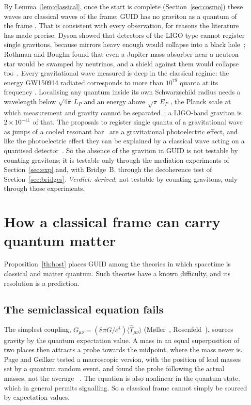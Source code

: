 By Lemma~\ref{lem:classical}, once the start is complete (Section~\ref{sec:cosmo}) these waves are classical waves of the frame: GUID has no graviton as a quantum
of the frame \tagD. That is consistent with every observation, for reasons the literature has made precise. Dyson showed that detectors of
the LIGO type cannot register single gravitons, because mirrors heavy enough would collapse into a black hole~\cite{dyson}; Rothman and
Boughn found that even a Jupiter-mass absorber near a neutron star would be swamped by neutrinos, and a shield against them would collapse
too~\cite{rb}. Every gravitational wave measured is deep in the classical regime: the energy GW150914 radiated corresponds to more than $10^{78}$
quanta at its frequency . Localising any quantum inside its own Schwarzschild radius needs a wavelength below $\sqrt{4\pi}\,L_P$ and
an energy above $\sqrt\pi\,E_P$ , the Planck scale at which measurement and gravity cannot be separated~\cite{mead}; a LIGO-band
graviton is $2\times10^{-41}$ of that. The proposals to register single quanta of a gravitational wave as jumps of a cooled resonant
bar~\cite{tobar} are a gravitational photoelectric effect, and like the photoelectric effect they can be explained by a classical wave acting
on a quantised detector~\cite{cdr}. So the absence of the graviton in GUID is not testable by counting gravitons; it is testable only
through the mediation experiments of Section~\ref{sec:exp} and, with Bridge~B, through the decoherence test of
Section~\ref{sec:bridges}. \emph{Verdict: derived}; not testable by counting gravitons, only through those experiments.

\section{How a classical frame can carry quantum matter}\label{sec:cq}

Proposition~\ref{th:host} places GUID among the theories in which spacetime is classical and matter quantum. Such theories have a known
difficulty, and its resolution is a prediction.

\subsection{The semiclassical equation fails}

The simplest coupling, $G_{\mu\nu}=(8\pi G/c^4)\langle\hat T_{\mu\nu}\rangle$ (M{\o}ller~\cite{moller}, Rosenfeld~\cite{rosenfeld63}),
sources gravity by the quantum expectation value. A mass in an equal superposition of two places then attracts a probe towards the midpoint,
where the mass never is. Page and Geilker tested a macroscopic version, with the position of lead masses set by a quantum random event, and
found the probe following the actual masses, not the average~\cite{pagegeilker} \tagP. The equation is also nonlinear in the quantum state,
which in general permits signalling. So a classical frame cannot simply be sourced by expectation values.

